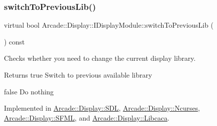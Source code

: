 \mbox{\label{classArcade_1_1Display_1_1IDisplayModule_a498d51597164e9f92e97ec2afee426b0}} 
\subsubsection{\texorpdfstring{switchToPreviousLib()}{switchToPreviousLib()}}
{\footnotesize\ttfamily virtual bool Arcade\+::\+Display\+::\+I\+Display\+Module\+::switch\+To\+Previous\+Lib (\begin{DoxyParamCaption}{ }\end{DoxyParamCaption}) const\hspace{0.3cm}{\ttfamily [pure virtual]}}



Checks whether you need to change the current display library. 

\begin{DoxyReturn}{Returns}
true Switch to previous available library 

false Do nothing 
\end{DoxyReturn}


Implemented in \mbox{\hyperlink{classArcade_1_1Display_1_1SDL_a27364feeadd0eb907f91e9e4c2ec1ef2}{Arcade\+::\+Display\+::\+S\+DL}}, \mbox{\hyperlink{classArcade_1_1Display_1_1Ncurses_ab92672cecd6fad3116de09fa3f315331}{Arcade\+::\+Display\+::\+Ncurses}}, \mbox{\hyperlink{classArcade_1_1Display_1_1SFML_ae77df516bddc7ed5a4c0acdcf2443225}{Arcade\+::\+Display\+::\+S\+F\+ML}}, and \mbox{\hyperlink{classArcade_1_1Display_1_1Libcaca_a2a195b508b59233ca226adfb9716754b}{Arcade\+::\+Display\+::\+Libcaca}}.

